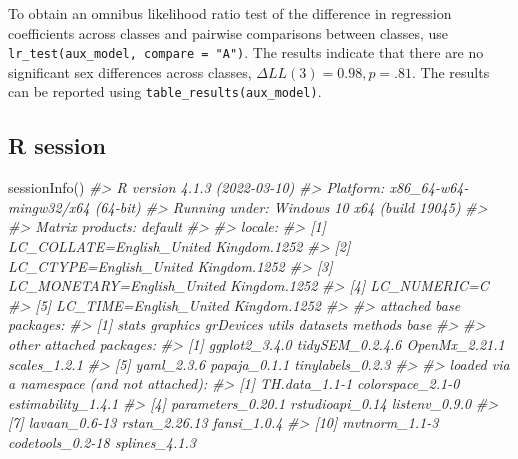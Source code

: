 \documentclass[
  man,floatsintext]{apa6}
\newenvironment{Shaded}{\begin{snugshade}}{\end{snugshade}}
\newcommand{\CommentTok}[1]{\textcolor[rgb]{0.56,0.35,0.01}{\textit{#1}}}
\newcommand{\FunctionTok}[1]{\textcolor[rgb]{0.00,0.00,0.00}{#1}}
\newcommand{\NormalTok}[1]{#1}
\begin{document}
To obtain an omnibus likelihood ratio test of the difference in regression coefficients across classes and pairwise comparisons between classes, use \texttt{lr\_test(aux\_model,\ compare\ =\ "A")}.
The results indicate that there are no significant sex differences across classes, \(\Delta LL(3) = 0.98, p = .81\).
The results can be reported using \texttt{table\_results(aux\_model)}.

\hypertarget{r-session}{%
\subsection{R session}\label{r-session}}

\begin{Shaded}
\begin{Highlighting}[]
\FunctionTok{sessionInfo}\NormalTok{()}
\CommentTok{\#\textgreater{} R version 4.1.3 (2022{-}03{-}10)}
\CommentTok{\#\textgreater{} Platform: x86\_64{-}w64{-}mingw32/x64 (64{-}bit)}
\CommentTok{\#\textgreater{} Running under: Windows 10 x64 (build 19045)}
\CommentTok{\#\textgreater{} }
\CommentTok{\#\textgreater{} Matrix products: default}
\CommentTok{\#\textgreater{} }
\CommentTok{\#\textgreater{} locale:}
\CommentTok{\#\textgreater{} [1] LC\_COLLATE=English\_United Kingdom.1252 }
\CommentTok{\#\textgreater{} [2] LC\_CTYPE=English\_United Kingdom.1252   }
\CommentTok{\#\textgreater{} [3] LC\_MONETARY=English\_United Kingdom.1252}
\CommentTok{\#\textgreater{} [4] LC\_NUMERIC=C                           }
\CommentTok{\#\textgreater{} [5] LC\_TIME=English\_United Kingdom.1252    }
\CommentTok{\#\textgreater{} }
\CommentTok{\#\textgreater{} attached base packages:}
\CommentTok{\#\textgreater{} [1] stats     graphics  grDevices utils     datasets  methods   base     }
\CommentTok{\#\textgreater{} }
\CommentTok{\#\textgreater{} other attached packages:}
\CommentTok{\#\textgreater{} [1] ggplot2\_3.4.0    tidySEM\_0.2.4.6  OpenMx\_2.21.1    scales\_1.2.1    }
\CommentTok{\#\textgreater{} [5] yaml\_2.3.6       papaja\_0.1.1     tinylabels\_0.2.3}
\CommentTok{\#\textgreater{} }
\CommentTok{\#\textgreater{} loaded via a namespace (and not attached):}
\CommentTok{\#\textgreater{}   [1] TH.data\_1.1{-}1         colorspace\_2.1{-}0      estimability\_1.4.1   }
\CommentTok{\#\textgreater{}   [4] parameters\_0.20.1     rstudioapi\_0.14       listenv\_0.9.0        }
\CommentTok{\#\textgreater{}   [7] lavaan\_0.6{-}13         rstan\_2.26.13         fansi\_1.0.4          }
\CommentTok{\#\textgreater{}  [10] mvtnorm\_1.1{-}3         codetools\_0.2{-}18      splines\_4.1.3        }

\end{Highlighting}
\end{Shaded}
\end{document}
